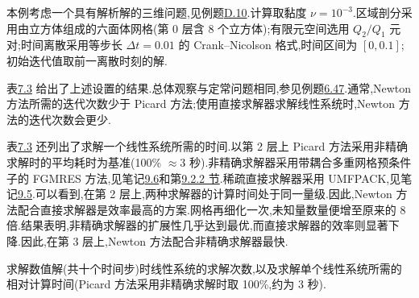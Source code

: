\begin{example}
\label{ex:time-dependent-picard-vs-newton}
本例考虑一个具有解析解的三维问题,见例题\hyperref[ex:appendix-d-10]{D.10}.计算取黏度 $\nu=10^{-3}$.区域剖分采用由立方体组成的六面体网格(第 0 层含 8 个立方体);有限元空间选用 $Q_2/Q_1$ 元对;时间离散采用等步长 $\Delta t=0.01$ 的 Crank--Nicolson 格式,时间区间为 $[0,0.1]$;初始迭代值取前一离散时刻的解.

表\hyperref[tab:time-dependent-picard-newton]{7.3} 给出了上述设置的结果.总体观察与定常问题相同,参见例题\hyperref[ex:steady-ns-picard-vs-newton]{6.47}.通常,Newton 方法所需的迭代次数少于 Picard 方法;使用直接求解器求解线性系统时,Newton 方法的迭代次数会更少.

表\hyperref[tab:time-dependent-picard-newton]{7.3} 还列出了求解一个线性系统所需的时间.以第 2 层上 Picard 方法采用非精确求解时的平均耗时为基准(100\% $\approx 3$ 秒).非精确求解器采用带耦合多重网格预条件子的 FGMRES 方法,见笔记\hyperref[note:chapter9-multigrid-preconditioner]{9.6}和第\hyperref[subsec:chapter9-iterative-solvers]{9.2.2 节}.稀疏直接求解器采用 UMFPACK,见笔记\hyperref[note:chapter9-solver-choice]{9.5}.可以看到,在第 2 层上,两种求解器的计算时间处于同一量级.因此,Newton 方法配合直接求解器是效率最高的方案.网格再细化一次,未知量数量便增至原来的 8 倍.结果表明,非精确求解器的扩展性几乎达到最优,而直接求解器的效率则显著下降.因此,在第 3 层上,Newton 方法配合非精确求解器最快.

\begin{eleganttable}
\centering
{}
\label{tab:time-dependent-picard-newton}
\scriptsize
\setlength{\tabcolsep}{2.8pt}
\renewcommand{\arraystretch}{1.12}
\par\smallskip
\footnotesize 求解数值解(共十个时间步)时线性系统的求解次数,以及求解单个线性系统所需的相对计算时间(Picard 方法采用非精确求解时取 100\%,约为 3 秒).
\end{eleganttable}
\end{example}

